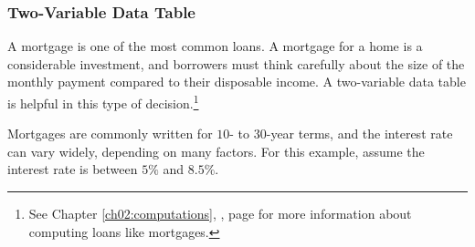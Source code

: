 \subsubsection{Two-Variable Data Table}

A mortgage is one of the most common loans. A mortgage for a home is a considerable investment, and borrowers must think carefully about the size of the monthly payment compared to their disposable income. A two-variable data table is helpful in this type of decision.\footnote{See Chapter \ref{ch02:computations}, , page \pageref{ch02:computations} for more information about computing loans like mortgages.}

Mortgages are commonly written for $ 10 $- to $ 30 $-year terms, and the interest rate can vary widely, depending on many factors. For this example, assume the interest rate is between $ 5\% $ and $ 8.5\% $.

